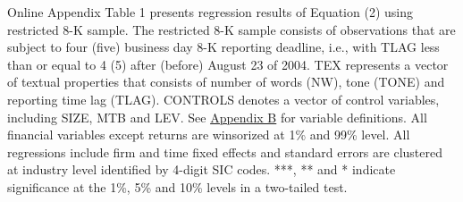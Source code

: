 \begin{table}[H]
\begin{footnotesize}
			\noindent Online Appendix Table 1 presents regression results of Equation (2) using restricted 8-K sample. The restricted 8-K sample consists of observations that are subject to four (five) business day 8-K reporting deadline, i.e., with TLAG less than or equal to 4 (5) after (before) August 23 of 2004. TEX represents a vector of textual properties that consists of number of words (NW), tone (TONE) and reporting time lag (TLAG). CONTROLS denotes a vector of control variables, including SIZE, MTB and LEV. See \hyperref[appb]{Appendix B} for variable definitions. All financial variables except returns are winsorized at 1\% and 99\% level. All regressions include firm and time fixed effects and standard errors are clustered at industry level identified by 4-digit SIC codes. ***, ** and * indicate significance at the 1\%, 5\% and 10\% levels in a two-tailed test.
		\end{footnotesize}
\end{table}%
